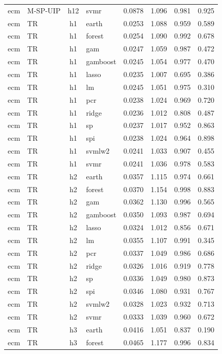 \begin{ThreePartTable}
\begin{longtable}[t]{llclcccc}
ecm & M-SP-UIP & h12 & svmr & 0.0878 & 1.096 & 0.981 & 0.925\\
\addlinespace
ecm & TR & h1 & earth & 0.0253 & 1.088 & 0.959 & 0.589\\
ecm & TR & h1 & forest & 0.0254 & 1.090 & 0.992 & 0.678\\
ecm & TR & h1 & gam & 0.0247 & 1.059 & 0.987 & 0.472\\
ecm & TR & h1 & gamboost & 0.0245 & 1.054 & 0.977 & 0.470\\
ecm & TR & h1 & lasso & 0.0235 & 1.007 & 0.695 & 0.386\\
ecm & TR & h1 & lm & 0.0245 & 1.051 & 0.975 & 0.310\\
ecm & TR & h1 & pcr & 0.0238 & 1.024 & 0.969 & 0.720\\
ecm & TR & h1 & ridge & 0.0236 & 1.012 & 0.808 & 0.487\\
ecm & TR & h1 & sp & 0.0237 & 1.017 & 0.952 & 0.863\\
ecm & TR & h1 & spi & 0.0238 & 1.024 & 0.964 & 0.898\\
ecm & TR & h1 & svmlw2 & 0.0241 & 1.033 & 0.907 & 0.455\\
ecm & TR & h1 & svmr & 0.0241 & 1.036 & 0.978 & 0.583\\
\addlinespace
ecm & TR & h2 & earth & 0.0357 & 1.115 & 0.974 & 0.661\\
ecm & TR & h2 & forest & 0.0370 & 1.154 & 0.998 & 0.883\\
ecm & TR & h2 & gam & 0.0362 & 1.130 & 0.996 & 0.565\\
ecm & TR & h2 & gamboost & 0.0350 & 1.093 & 0.987 & 0.694\\
ecm & TR & h2 & lasso & 0.0324 & 1.012 & 0.856 & 0.671\\
ecm & TR & h2 & lm & 0.0355 & 1.107 & 0.991 & 0.345\\
ecm & TR & h2 & pcr & 0.0337 & 1.049 & 0.986 & 0.686\\
ecm & TR & h2 & ridge & 0.0326 & 1.016 & 0.919 & 0.778\\
ecm & TR & h2 & sp & 0.0336 & 1.049 & 0.980 & 0.873\\
ecm & TR & h2 & spi & 0.0346 & 1.080 & 0.931 & 0.767\\
ecm & TR & h2 & svmlw2 & 0.0328 & 1.023 & 0.932 & 0.713\\
ecm & TR & h2 & svmr & 0.0333 & 1.039 & 0.960 & 0.672\\
\addlinespace
ecm & TR & h3 & earth & 0.0416 & 1.051 & 0.837 & 0.190\\
ecm & TR & h3 & forest & 0.0465 & 1.177 & 0.996 & 0.834\\

\end{longtable}
\end{ThreePartTable}
